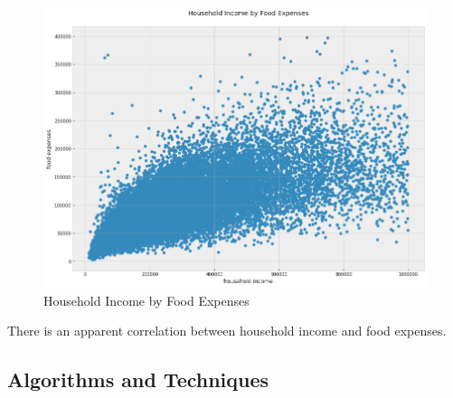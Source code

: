 \documentclass{article}
\begin{document}
\begin{figure}[H]
\caption{Household Income by Food Expenses}
\centering
\includegraphics[width = 0.7 \textwidth]{household_income_food_expenses}
\end{figure}

There is an apparent correlation between household income and food expenses.

\subsection{Algorithms and Techniques}
\end{document}
